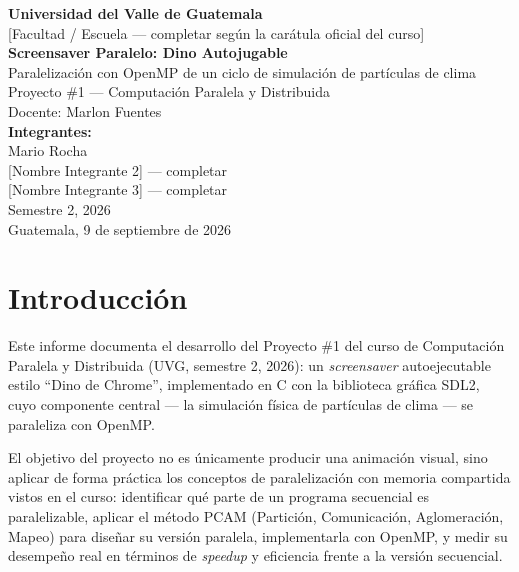 \documentclass[12pt,letterpaper]{article}
\begin{document}
\begin{titlepage}
\begin{center}

{\large \textbf{Universidad del Valle de Guatemala}}\\[0.3cm]
{\normalsize [Facultad / Escuela --- completar según la carátula oficial del curso]}\\[2.5cm]

{\Large \textbf{Screensaver Paralelo: Dino Autojugable}}\\[0.3cm]
{\large Paralelización con OpenMP de un ciclo de simulación de partículas de clima}\\[2cm]

{\normalsize Proyecto \#1 --- Computación Paralela y Distribuida}\\[0.2cm]
{\normalsize Docente: Marlon Fuentes}\\[2cm]

{\normalsize \textbf{Integrantes:}}\\[0.2cm]
{\normalsize Mario Rocha}\\
{\normalsize [Nombre Integrante 2] --- completar}\\
{\normalsize [Nombre Integrante 3] --- completar}\\[2.5cm]

{\normalsize Semestre 2, 2026}\\
{\normalsize Guatemala, 9 de septiembre de 2026}

\end{center}
\end{titlepage}

\tableofcontents
\newpage

\section{Introducción}

Este informe documenta el desarrollo del Proyecto \#1 del curso de
Computación Paralela y Distribuida (UVG, semestre 2, 2026): un
\emph{screensaver} autoejecutable estilo ``Dino de Chrome'', implementado
en C con la biblioteca gráfica SDL2, cuyo componente central --- la
simulación física de partículas de clima --- se paraleliza con OpenMP.

El objetivo del proyecto no es únicamente producir una animación visual,
sino aplicar de forma práctica los conceptos de paralelización con
memoria compartida vistos en el curso: identificar qué parte de un
programa secuencial es paralelizable, aplicar el método PCAM
(Partición, Comunicación, Aglomeración, Mapeo) para diseñar su versión
paralela, implementarla con OpenMP, y medir su desempeño real en
términos de \emph{speedup} y eficiencia frente a la versión secuencial.
\end{document}
